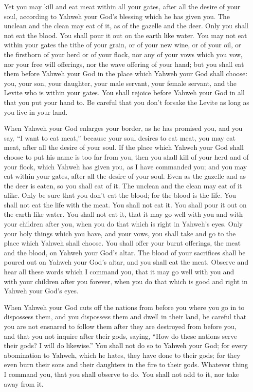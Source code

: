  Yet you may kill and eat meat within all your gates, after
all the desire of your soul, according to Yahweh your God's blessing
which he has given you. The unclean and the clean may eat of it, as of
the gazelle and the deer.  Only you shall not eat the
blood. You shall pour it out on the earth like water.  You
may not eat within your gates the tithe of your grain, or of your new
wine, or of your oil, or the firstborn of your herd or of your flock,
nor any of your vows which you vow, nor your free will offerings, nor
the wave offering of your hand;  but you shall eat them
before Yahweh your God in the place which Yahweh your God shall choose:
you, your son, your daughter, your male servant, your female servant,
and the Levite who is within your gates. You shall rejoice before Yahweh
your God in all that you put your hand to.  Be careful that
you don't forsake the Levite as long as you live in your land.

 When Yahweh your God enlarges your border, as he has
promised you, and you say, ``I want to eat meat,'' because your soul
desires to eat meat, you may eat meat, after all the desire of your
soul.  If the place which Yahweh your God shall choose to
put his name is too far from you, then you shall kill of your herd and
of your flock, which Yahweh has given you, as I have commanded you; and
you may eat within your gates, after all the desire of your soul.
 Even as the gazelle and as the deer is eaten, so you shall
eat of it. The unclean and the clean may eat of it alike. 
Only be sure that you don't eat the blood; for the blood is the life.
You shall not eat the life with the meat.  You shall not
eat it. You shall pour it out on the earth like water.  You
shall not eat it, that it may go well with you and with your children
after you, when you do that which is right in Yahweh's eyes.
 Only your holy things which you have, and your vows, you
shall take and go to the place which Yahweh shall choose. 
You shall offer your burnt offerings, the meat and the blood, on Yahweh
your God's altar. The blood of your sacrifices shall be poured out on
Yahweh your God's altar, and you shall eat the meat. 
Observe and hear all these words which I command you, that it may go
well with you and with your children after you forever, when you do that
which is good and right in Yahweh your God's eyes.

 When Yahweh your God cuts off the nations from before you
where you go in to dispossess them, and you dispossess them and dwell in
their land,  be careful that you are not ensnared to follow
them after they are destroyed from before you, and that you not inquire
after their gods, saying, ``How do these nations serve their gods? I
will do likewise.''  You shall not do so to Yahweh your
God; for every abomination to Yahweh, which he hates, they have done to
their gods; for they even burn their sons and their daughters in the
fire to their gods.  Whatever thing I command you, that you
shall observe to do. You shall not add to it, nor take away from it.

